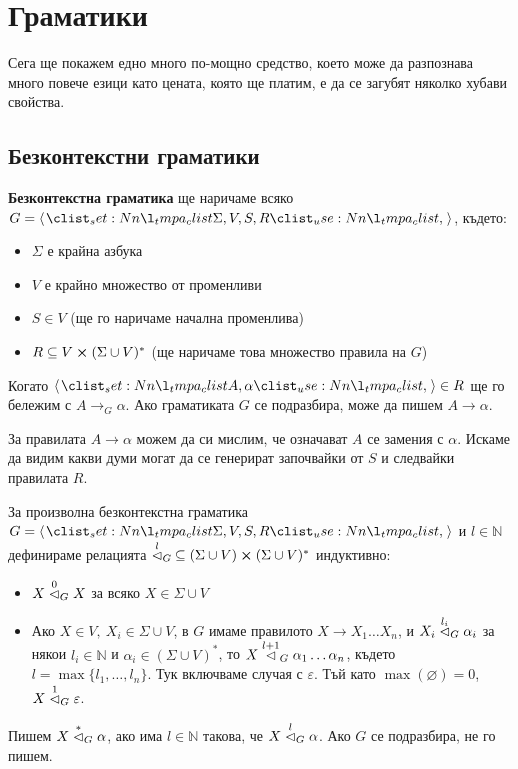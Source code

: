 \chapter{Граматики}

Сега ще покажем едно много по-мощно средство,
което може да разпознава много повече езици като цената, която ще платим,
е да се загубят няколко хубави свойства.

\section{Безконтекстни граматики}

\begin{definition}
    \textbf{Безконтекстна граматика} ще наричаме всяко $G = \opair{\Sigma, V, S, R}$, където:
    \begin{itemize}
        \item $\Sigma$ е крайна азбука
        \item $V$ е крайно множество от променливи
        \item $S \in V$ (ще го наричаме начална променлива)
        \item $R \subseteq V \cross (\Sigma \cup V)^*$ (ще наричаме това множество правила на $G$)
    \end{itemize}
\end{definition}

\begin{remark}
    Когато $\opair{A, \alpha} \in R$ ще го бележим с $A \rightarrow_G \alpha$.
    Ако граматиката $G$ се подразбира, може да пишем $A \rightarrow \alpha$.
\end{remark}

За правилата $A \rightarrow \alpha$ можем да си мислим, че означават $A$ се замения с $\alpha$.
Искаме да видим какви думи могат да се генерират започвайки от $S$ и следвайки правилата $R$.

\begin{definition}
    За произволна безконтекстна граматика $G = \opair{\Sigma, V, S, R}$ и $l \in \mathbb{N}$ дефинираме релацията $\stackrel{l}{\vartriangleleft}_G \: \subseteq (\Sigma \cup V) \cross (\Sigma \cup V)^*$ индуктивно:
    \begin{itemize}
        \item $X \stackrel{0}{\vartriangleleft}_G X$ за всяко $X \in \Sigma \cup V$
        \item Ако $X \in V, \: X_i \in \Sigma \cup V$, в $G$ имаме правилото $X \rightarrow X_1 \dots X_n$, и $X_i \stackrel{l_i}{\vartriangleleft}_G \alpha_i$ за някои $l_i \in \mathbb{N}$ и $\alpha_i \in (\Sigma \cup V)^*$,
              то $X \stackrel{l + 1}{\vartriangleleft}_G \alpha_1 \dots \alpha_n$, където $l = \max \{ l_1, \dots, l_n \}$. Тук включваме случая с $\varepsilon$.
              Тъй като $\max(\varnothing) = 0$, $X \stackrel{1}{\vartriangleleft}_G \varepsilon$.
    \end{itemize}
    Пишем $X \stackrel{*}{\vartriangleleft}_G \alpha$, ако има $l \in \mathbb{N}$ такова, че $X \stackrel{l}{\vartriangleleft}_G \alpha$.
    Ако $G$ се подразбира, не го пишем.
\end{definition}

